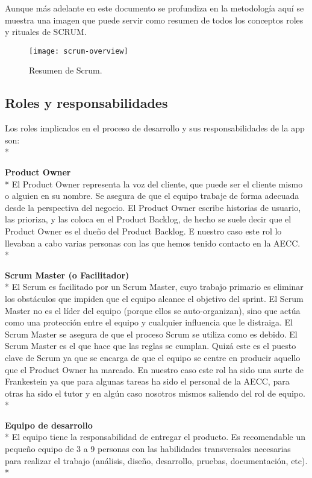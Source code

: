 \documentclass[../pfc.tex]{subfiles}
\begin{document}
	Aunque más adelante en este documento se profundiza en la metodología aquí se muestra una imagen que puede servir como resumen de todos los conceptos roles y rituales de SCRUM.
	
		\begin{figure}[h]
			\centering
			\texttt{[image: scrum-overview]}
			\caption{Resumen de Scrum.}
			\label{fig:Resumen de Scrum}
		\end{figure}
	
	\subsection{Roles y responsabilidades}
	Los roles  implicados en el proceso de desarrollo y sus responsabilidades de la app son:\\*

	\textbf{Product Owner}\\*
	El Product Owner representa la voz del cliente, que puede ser el cliente mismo o alguien en su nombre. Se asegura de que el equipo trabaje de forma adecuada desde la perspectiva del negocio. El Product Owner escribe historias de usuario, las prioriza, y las coloca en el Product Backlog, de hecho se suele decir que el Product Owner es el dueño del Product Backlog. E nuestro caso este rol lo llevaban a cabo varias personas con las que hemos tenido contacto en la AECC.\\*
	
	\textbf{Scrum Master (o Facilitador)}\\*
	El Scrum es facilitado por un Scrum Master, cuyo trabajo primario es eliminar los obstáculos que impiden que el equipo alcance el objetivo del sprint. El Scrum Master no es el líder del equipo (porque ellos se auto-organizan), sino que actúa como una protección entre el equipo y cualquier influencia que le distraiga. El Scrum Master se asegura de que el proceso Scrum se utiliza como es debido. El Scrum Master es el que hace que las reglas se cumplan. Quizá este es el puesto clave de Scrum ya que se encarga de que el equipo se centre en producir aquello que el Product Owner ha marcado. En nuestro caso este rol ha sido una surte de Frankestein ya que para algunas tareas ha sido el personal de la AECC, para otras ha sido el tutor y en algún caso nosotros mismos saliendo del rol de equipo. \\*
	
	\textbf{Equipo de desarrollo}\\*
	El equipo tiene la responsabilidad de entregar el producto. Es recomendable un pequeño equipo de 3 a 9 personas con las habilidades transversales necesarias para realizar el trabajo (análisis, diseño, desarrollo, pruebas, documentación, etc).\\*
	
\end{document}
